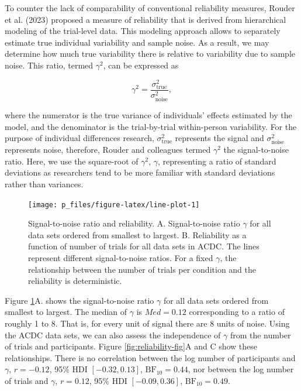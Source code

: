\documentclass[
  man,floatsintext]{apa6}
\begin{document}
To counter the lack of comparability of conventional reliability measures, Rouder et al. (2023) proposed a measure of reliability that is derived from hierarchical modeling of the trial-level data. This modeling approach allows to separately estimate true individual variability and sample noise. As a result, we may determine how much true variability there is relative to variability due to sample noise. This ratio, termed \(\gamma^2\), can be expressed as

\[\gamma^2 = \frac{\sigma^2_{\text{true}}}{\sigma^2_{\text{noise}}},\]

where the numerator is the true variance of individuals' effects estimated by the model, and the denominator is the trial-by-trial within-person variability. For the purpose of individual differences research, \(\sigma^2_{\text{true}}\) represents the signal and \(\sigma^2_{\text{noise}}\) represents noise, therefore, Rouder and colleagues termed \(\gamma^2\) the signal-to-noise ratio. Here, we use the square-root of \(\gamma^2\), \(\gamma\), representing a ratio of standard deviations as researchers tend to be more familiar with standard deviations rather than variances.



\begin{figure}

{\centering \texttt{[image: p\_files/figure-latex/line-plot-1]} 

}

\caption{Signal-to-noise ratio and reliability. A. Signal-to-noise ratio \(\gamma\) for all data sets ordered from smallest to largest. B. Reliability as a function of number of trials for all data sets in ACDC. The lines represent different signal-to-noise ratios. For a fixed \(\gamma\), the relationship between the number of trials per condition and the reliability is deterministic.}\label{fig:line-plot}
\end{figure}

Figure \ref{fig:line-plot}A. shows the signal-to-noise ratio \(\gamma\) for all data sets ordered from smallest to largest. The median of \(\gamma\) is \(Med = 0.12\) corresponding to a ratio of roughly 1 to 8. That is, for every unit of signal there are 8 units of noise. Using the ACDC data sets, we can also assess the independence of \(\gamma\) from the number of trials and participants. Figure \ref{fig:reliability-fig}A and C show these relationships. There is no correlation between the log number of participants and \(\gamma\), \(r = -0.12\), 95\% HDI \([-0.32, 0.13]\), \(\mathrm{BF}_{\textrm{10}} = 0.44\), nor between the log number of trials and \(\gamma\), \(r = 0.12\), 95\% HDI \([-0.09, 0.36]\), \(\mathrm{BF}_{\textrm{10}} = 0.49\).
\end{document}
